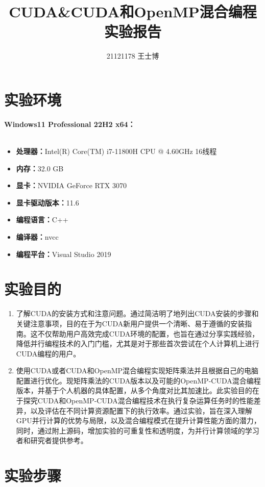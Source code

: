 \documentclass{article}
\title{\Huge CUDA\&CUDA和OpenMP混合编程实验报告}
\author{21121178 王士博}
\begin{document}
\maketitle
\section{实验环境}
\textbf{Windows11 Professional 22H2 x64：} \\
\\
\indent \indent \indent \begin{minipage}[H]{0.7\textwidth}
    \begin{itemize}
        \item \textbf{处理器：}Intel(R) Core(TM) i7-11800H CPU @ 4.60GHz 16线程
        \item \textbf{内存：}32.0 GB
        \item \textbf{显卡：}NVIDIA GeForce RTX 3070
        \item \textbf{显卡驱动版本：}11.6
        \item \textbf{编程语言：}C++
        \item \textbf{编译器：}nvcc
        \item \textbf{编程平台：}Visual Studio 2019
    \end{itemize}
\end{minipage}
\section{实验目的}
\begin{enumerate}
    \item 了解CUDA的安装方式和注意问题。通过简洁明了地列出CUDA安装的步骤和关键注意事项，目的在于为CUDA新用户提供一个清晰、易于遵循的安装指南。这不仅帮助用户高效完成CUDA环境的配置，也旨在通过分享实践经验，降低并行编程技术的入门门槛，尤其是对于那些首次尝试在个人计算机上进行CUDA编程的用户。
    \item 使用CUDA或者CUDA和OpenMP混合编程实现矩阵乘法并且根据自己的电脑配置进行优化。现矩阵乘法的CUDA版本以及可能的OpenMP-CUDA混合编程版本，并基于个人机器的具体配置，从多个角度对比其加速比。此实验目的在于探究CUDA和OpenMP-CUDA混合编程技术在执行复杂运算任务时的性能差异，以及评估在不同计算资源配置下的执行效率。通过实验，旨在深入理解GPU并行计算的优势与局限，以及混合编程模式在提升计算性能方面的潜力，同时，通过附上源码，增加实验的可重复性和透明度，为并行计算领域的学习者和研究者提供参考。
\end{enumerate}
\section{实验步骤}
\end{document}

